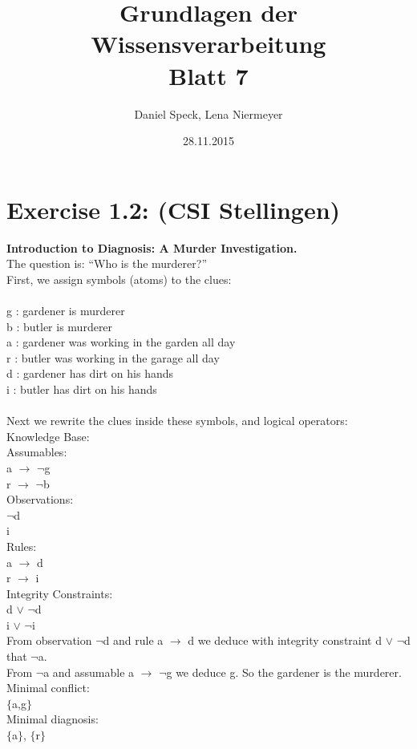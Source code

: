 \documentclass[10pt,a4paper]{article}
\title{\textbf{\huge Grundlagen der Wissensverarbeitung
		\\\Large Blatt 7}}
\author{Daniel Speck, Lena Niermeyer}
\date{28.11.2015}
\begin{document}
		
	\maketitle
		
	\section*{Exercise 1.2: (CSI Stellingen)}
	

\textbf{Introduction to Diagnosis: A Murder Investigation.}
\\
The question is: “Who is the murderer?” \\
First, we assign symbols (atoms) to the clues: \\
\\
g : gardener is murderer \\
b : butler is murderer \\
a : gardener was working in the garden all day \\
r : butler was working in the garage all day \\
d : gardener has dirt on his hands \\
i : butler has dirt on his hands \\
\\
Next we rewrite the clues inside these symbols, and logical operators: \\
Knowledge Base:\\
Assumables: \\
a $\rightarrow$ $\lnot$g \\
r $\rightarrow$ $\lnot$b \\
Observations: \\
$\lnot$d \\
i \\
Rules: \\
a $\rightarrow$ d \\
r $\rightarrow$ i \\
Integrity Constraints: \\
d $\lor$ $\lnot$d \\
i $\lor$ $\lnot$i \\
From observation $\lnot$d and rule a $\rightarrow$ d we deduce with integrity constraint d $\lor$ $\lnot$d that $\lnot$a. \\
From $\lnot$a and assumable a $\rightarrow$ $\lnot$g we deduce g. So the gardener is the murderer. \\
Minimal conflict: \\
$ \{ $a,g$ \} $ \\
Minimal diagnosis: \\
$ \{ $a$ \} $, $ \{ $r$ \} $ \\
\end{document}
